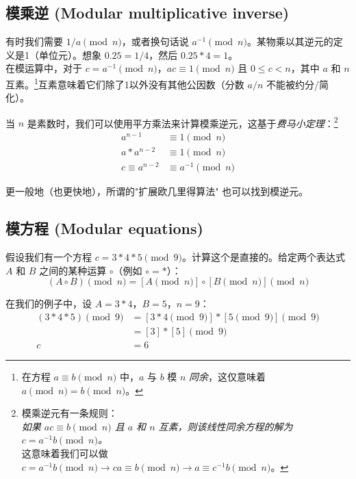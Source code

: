 \subsection{模乘逆 (Modular multiplicative inverse)}

有时我们需要 $1/a \pmod n$，或者换句话说 $a^{-1} \pmod n$。某物乘以其逆元的定义是1（单位元）。想象 $0.25 = 1/4$，然后 $0.25*4 = 1$。\\

在模运算中，对于 $c = a^{-1} \pmod{n}$，$a c \equiv 1 \pmod{n}$ 且 $0 \leq c < n$，其中 $a$ 和 $n$ 互素。\footnote{在方程 $a \equiv b \pmod{n}$ 中，$a$ 与 $b$ 模 $n$ {\em 同余}，这仅意味着 \(a \pmod{n} = b \pmod{n}\)。}互素意味着它们除了1以外没有其他公因数（分数 $a/n$ 不能被约分/简化）。

当 $n$ 是素数时，我们可以使用平方乘法来计算模乘逆元，这基于{\em 费马小定理}：\footnote{\label{inverse_rule_note}模乘逆元有一条规则：\\
{\em 如果 $a c \equiv b \pmod{n}$ 且 $a$ 和 $n$ 互素，则该线性同余方程的解为 \(c = a^{-1} b \pmod{n}\)。}\cite{wiki-modular-arithmetic}\\
这意味着我们可以做 $c = a^{-1} b \pmod n \rightarrow ca \equiv b \pmod n \rightarrow a \equiv c^{-1} b \pmod n$。}\vspace{.175cm}
\begin{align*} 
    a^{n-1} &\equiv 1 \pmod{n} \\
    a*a^{n-2} &\equiv 1 \pmod{n} \\
    c \equiv a^{n-2} &\equiv a^{-1} \pmod{n}
\end{align*}

更一般地（也更快地），所谓的"扩展欧几里得算法" \cite{extended-euclidean} 也可以找到模逆元。


\subsection{模方程 (Modular equations)}
\label{subsec:modular-equations}

假设我们有一个方程 $c = 3*4*5 \pmod 9$。计算这个是直接的。给定两个表达式 $A$ 和 $B$ 之间的某种运算 $\circ$（例如 $\circ = *$）：\vspace{.175cm}
\[(A \circ B)\pmod{n} = {[A\pmod {n}] \circ [B\pmod{n}]}\pmod{n}\]

在我们的例子中，设 $A = 3*4$，$B = 5$，$n = 9$：\vspace{.175cm}
\begin{align*}
(3*4 * 5) \pmod{9} &= {[3*4 \pmod {9}] * [5 \pmod{9}]} \pmod{9} \\
				   &= [3]*[5] \pmod 9 \\
				c &= 6
\end{align*}

